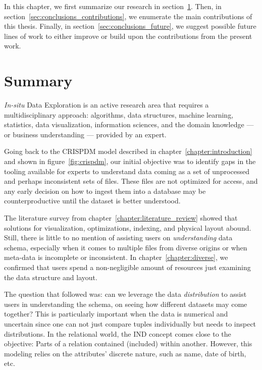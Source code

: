 In this chapter, we first summarize our research in section~\ref{sec:conclusions_summary}.
Then, in section~\ref{sec:conclusions_contributions}, we enumerate the main contributions
of this thesis. Finally, in section~\ref{sec:conclusions_future}, we suggest possible
future lines of work to either improve or build upon the contributions from the present work.

\section{Summary}
\label{sec:conclusions_summary}

\emph{In-situ} Data Exploration is an active research area that requires
a multidisciplinary approach: algorithms, data structures, machine learning,
statistics,  data visualization, information sciences, and the domain knowledge
--- or business understanding ---  provided by an expert.

Going back to the \gls{CRISPDM} model described in  chapter~\ref{chapter:introduction}
and shown in figure~\ref{fig:crispdm}, our initial objective was to identify
gaps in the tooling available for experts to understand data coming as a set of
unprocessed and perhaps inconsistent sets of files. These files are not optimized
for access, and any early decision on how to ingest them into a database may be
counterproductive until the dataset is better understood.

The literature survey from chapter~\ref{chapter:literature_review} showed that
solutions for visualization, optimizations, indexing, and physical layout abound.
Still, there is little to no mention of assisting users on \emph{understanding}
data schema, especially when it comes to multiple files from diverse origins or
when meta-data is incomplete or inconsistent.
In chapter~\ref{chapter:diverse}, we confirmed that users spend a non-negligible
amount of resources just examining the data structure and layout.

The question that followed was: can we leverage the data \emph{distribution} to
assist users in understanding the schema, on seeing how different datasets may come together?
This is particularly important when the data is numerical and uncertain since
one can not just compare tuples individually but needs to inspect distributions.
In the relational world, the \gls{IND} concept comes close to the objective:
Parts of a relation contained (included) within another. However, this modeling
relies on the attributes' discrete nature, such as name, date of birth, etc.

